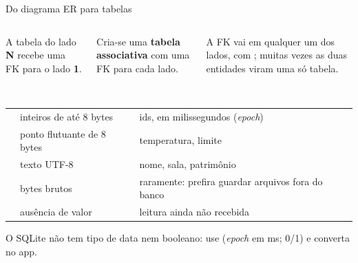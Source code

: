 \documentclass[aspectratio=169,10pt]{beamer}
\begin{document}
\begin{frame}{Do diagrama ER para tabelas}
  \begin{columns}[T]
    \begin{column}{0.32\textwidth}
      \begin{conceito}[1:N]
        A tabela do lado \textbf{N} recebe uma FK para o lado \textbf{1}.\\[2pt]
        \\
      \end{conceito}
    \end{column}
    \begin{column}{0.32\textwidth}
      \begin{conceito}[N:N]
        Cria-se uma \textbf{tabela associativa} com uma FK para cada lado.\\[2pt]
        \\ 
      \end{conceito}
    \end{column}
    \begin{column}{0.32\textwidth}
      \begin{conceito}[1:1]
        A FK vai em qualquer um dos lados, com ; muitas vezes as duas entidades viram uma só tabela.
      \end{conceito}
    \end{column}
  \end{columns}
  \footnotesize
  \renewcommand{\arraystretch}{1.08}
  \begin{tabularx}{\textwidth}{@{}l L L@{}}
    \toprule
     &  &  \\
    \midrule
     & inteiros de até 8 bytes & ids,  em milissegundos (\emph{epoch}) \\
     & ponto flutuante de 8 bytes & temperatura, limite \\
     & texto UTF-8 & nome, sala, patrimônio \\
     & bytes brutos & raramente: prefira guardar arquivos fora do banco \\
     & ausência de valor & leitura ainda não recebida \\
    \bottomrule
  \end{tabularx}
  \begin{dica}
    O SQLite não tem tipo de data nem booleano: use  (\emph{epoch} em ms; 0/1) e converta no app.
  \end{dica}
\end{frame}
\end{document}

